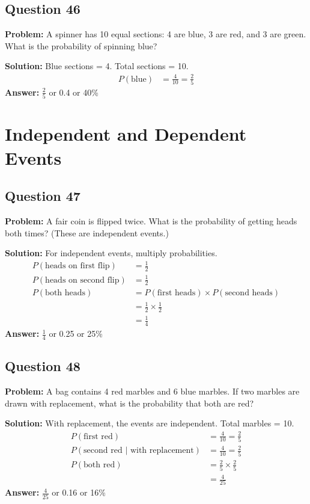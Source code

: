 \documentclass[12pt]{article}
\begin{document}
\subsection*{Question 46}
\textbf{Problem:} A spinner has 10 equal sections: 4 are blue, 3 are red, and 3 are green. What is the probability of spinning blue?

\textbf{Solution:} Blue sections = 4. Total sections = 10.
\begin{align*}
P(\text{blue}) &= \frac{4}{10} = \frac{2}{5}
\end{align*}
\textbf{Answer:} $\frac{2}{5}$ or 0.4 or 40\%

\section{Independent and Dependent Events}

\subsection*{Question 47}
\textbf{Problem:} A fair coin is flipped twice. What is the probability of getting heads both times? (These are independent events.)

\textbf{Solution:} For independent events, multiply probabilities. 
\begin{align*}
P(\text{heads on first flip}) &= \frac{1}{2} \\
P(\text{heads on second flip}) &= \frac{1}{2} \\
P(\text{both heads}) &= P(\text{first heads}) \times P(\text{second heads}) \\
&= \frac{1}{2} \times \frac{1}{2} \\
&= \frac{1}{4}
\end{align*}
\textbf{Answer:} $\frac{1}{4}$ or 0.25 or 25\%

\subsection*{Question 48}
\textbf{Problem:} A bag contains 4 red marbles and 6 blue marbles. If two marbles are drawn with replacement, what is the probability that both are red?

\textbf{Solution:} With replacement, the events are independent. Total marbles = 10.
\begin{align*}
P(\text{first red}) &= \frac{4}{10} = \frac{2}{5} \\
P(\text{second red | with replacement}) &= \frac{4}{10} = \frac{2}{5} \\
P(\text{both red}) &= \frac{2}{5} \times \frac{2}{5} \\
&= \frac{4}{25}
\end{align*}
\textbf{Answer:} $\frac{4}{25}$ or 0.16 or 16\%
\end{document}
